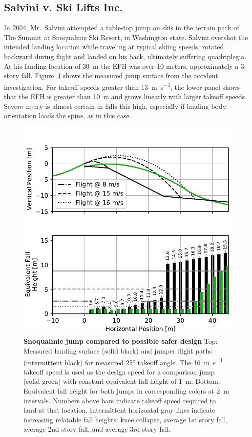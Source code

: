 \documentclass[smallextended]{svjour3}       %
\begin{document}
\subsection{Salvini v. Ski Lifts Inc.}
\label{sec:salvini}
%
In 2004, Mr.~Salvini attempted a table-top jump on skis in the terrain park of
The Summit at Snoqualmie Ski Resort, in Washington state. Salvini overshot the
intended landing location while traveling at typical skiing speeds, rotated
backward during flight and landed on his back, ultimately suffering
quadriplegia. At his landing location of 30~\si{\meter} the EFH was over 10
meters, approximately a 3-story fall.  Figure~\ref{fig:salvini-v-snoqualmie}
shows the measured jump surface from the accident investigation.  For takeoff
speeds greater than 13~\si{\meter\per\second}, the lower panel shows that the
EFH is greater than 10~\si{\meter} and grows linearly with larger takeoff
speeds. Severe injury is almost certain in falls this high, especially if
landing body orientation loads the spine, as in this case.
%
\begin{figure}
  \centering
  \includegraphics[width=\columnwidth]{figures/salvini-v-snoqualmie.pdf}
  \caption{\textbf{Snoqualmie jump compared to possible safer design}
  Top: Measured landing surface (solid black) and jumper flight paths
  (intermittent black) for measured 25\si{\degree} takeoff angle. The
  16~\si{\meter\per\second} takeoff speed is used as the design speed for a
  comparison jump (solid green) with constant equivalent fall height of
  1~\si{\meter}.
  Bottom: Equivalent fall height for both jumps in corresponding colors at
  2~\si{\meter} intervals. Numbers above bars indicate takeoff speed required
  to land at that location.
  Intermittent horizontal gray lines indicate increasing relatable fall
  heights: knee collapse, average 1st story fall, average 2nd story fall, and
  average 3rd story fall.
  }
  \label{fig:salvini-v-snoqualmie}
\end{figure}
\end{document}
